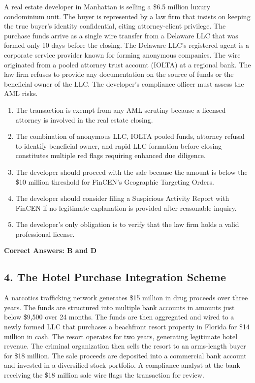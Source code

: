 \documentclass[11pt,a4paper]{article}
\begin{document}
	A real estate developer in Manhattan is selling a \$6.5 million luxury condominium unit. The buyer is represented by a law firm that insists on keeping the true buyer's identity confidential, citing attorney-client privilege. The purchase funds arrive as a single wire transfer from a Delaware LLC that was formed only 10 days before the closing. The Delaware LLC's registered agent is a corporate service provider known for forming anonymous companies. The wire originated from a pooled attorney trust account (IOLTA) at a regional bank. The law firm refuses to provide any documentation on the source of funds or the beneficial owner of the LLC. The developer's compliance officer must assess the AML risks.
	
	\begin{enumerate}[label=\Alph*.]
		\item The transaction is exempt from any AML scrutiny because a licensed attorney is involved in the real estate closing.
		\item The combination of anonymous LLC, IOLTA pooled funds, attorney refusal to identify beneficial owner, and rapid LLC formation before closing constitutes multiple red flags requiring enhanced due diligence.
		\item The developer should proceed with the sale because the amount is below the \$10 million threshold for FinCEN's Geographic Targeting Orders.
		\item The developer should consider filing a Suspicious Activity Report with FinCEN if no legitimate explanation is provided after reasonable inquiry.
		\item The developer's only obligation is to verify that the law firm holds a valid professional license.
	\end{enumerate}
	
	\textbf{Correct Answers: B and D}
	
	\subsection{4. The Hotel Purchase Integration Scheme}
	
	A narcotics trafficking network generates \$15 million in drug proceeds over three years. The funds are structured into multiple bank accounts in amounts just below \$9,500 over 24 months. The funds are then aggregated and wired to a newly formed LLC that purchases a beachfront resort property in Florida for \$14 million in cash. The resort operates for two years, generating legitimate hotel revenue. The criminal organization then sells the resort to an arms-length buyer for \$18 million. The sale proceeds are deposited into a commercial bank account and invested in a diversified stock portfolio. A compliance analyst at the bank receiving the \$18 million sale wire flags the transaction for review.
	
\end{document}
